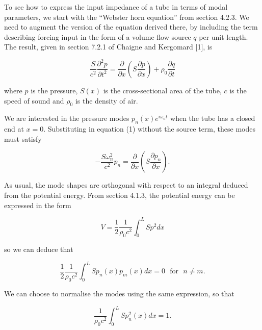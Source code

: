   To see how to express the input impedance of a tube in terms of modal 
  parameters, we start with the ``Webster horn equation'' from section 4.2.3. 
  We need to augment the version of the equation derived there, by including 
  the term describing forcing input in the form of a volume flow source $q$ per 
  unit length. The result, given in section 7.2.1 of Chaigne and Kergomard [1], 
  is 

  \begin{equation*}\dfrac{S}{c^2} \dfrac{\partial^2 p}{\partial t^2} = 
  \dfrac{\partial}{\partial x}\left(S\dfrac{\partial p}{\partial x} \right) + 
  \rho_0 \dfrac{\partial q}{\partial t} \tag{1}\end{equation*} 

  \noindent{}where $p$ is the pressure, $S(x)$ is the cross-sectional area of 
  the tube, $c$ is the speed of sound and $\rho_0$ is the density of air. 

  We are interested in the pressure modes $p_n(x) e^{i \omega_n t}$ when the 
  tube has a closed end at $x=0$. Substituting in equation (1) without the 
  source term, these modes must satisfy 

  \begin{equation*}-\frac{S \omega_n^2}{c^2}p_n = \dfrac{\partial}{\partial 
  x}\left(S\dfrac{\partial p_n}{\partial x} \right) . \tag{2}\end{equation*} 

  As usual, the mode shapes are orthogonal with respect to an integral deduced 
  from the potential energy. From section 4.1.3, the potential energy can be 
  expressed in the form 

  \begin{equation*}V=\dfrac{1}{2} \dfrac{1}{\rho_0 c^2} \int_0^L{S p^2 dx} 
  \tag{3}\end{equation*} 

  \noindent{}so we can deduce that 

  \begin{equation*}\dfrac{1}{2} \dfrac{1}{\rho_0 c^2} \int_0^L{S p_n(x) p_m(x) 
  dx} = 0 \mathrm{~~~for~~~} n \ne m . \tag{4}\end{equation*} 

  We can choose to normalise the modes using the same expression, so that 

  \begin{equation*}\dfrac{1}{\rho_0 c^2} \int_0^L{S p_n^2(x) dx} = 1. 
  \tag{5}\end{equation*} 

